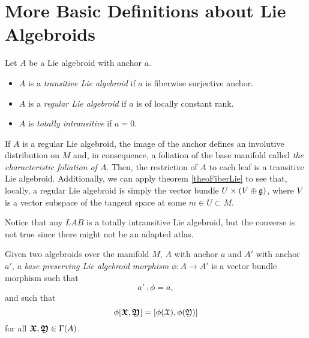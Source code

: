 \section{More Basic Definitions about Lie Algebroids}
\begin{definition}
    Let $A$ be a Lie algebroid with anchor $a$.
    
    \begin{itemize}
    
    \item $A$ is a \emph{transitive Lie algebroid} if $a$ is fiberwise surjective anchor.
    
    \item $A$ is a \emph{regular Lie algebroid} if $a$ is of locally constant rank.
    
    \item $A$ is \emph{totally intransitive} if $a = 0$.
    
    \end{itemize}
    
\end{definition}

If $A$ is a regular Lie algebroid, the image of the anchor defines an involutive distribution on $M$ and, in consequence, a foliation of the base manifold called \emph{the characteristic foliation of $A$}. Then, the restriction of $A$ to each leaf is a transitive Lie algebroid. Additionally, we can apply theorem \ref{theoFiberLie} to see that, locally, a regular Lie algebroid is simply the vector bundle $U \times (V \oplus \mathfrak{g})$, where $V$ is a vector subspace of the tangent space at some $m \in U \subset M$.

Notice that any $LAB$ is a totally intransitive Lie algebroid, but the converse is not true since there might not be an adapted atlas.

\begin{definition}  
Given two algebroids over the manifold $M$, $A$ with anchor $a$ and $A'$ with anchor $a'$, \emph{a base preserving Lie algebroid morphism} $\phi: A \to A'$ is a vector bundle morphism such that \[a' \comp \phi = a, \] and such that \[\phi[\sect{\oid X}, \sect{\oid Y}] = [\phi(\oid X), \phi(\oid Y)]\] for all $\bm{\mathfrak{X}}, \bm{\mathfrak{Y}} \in \Gamma(A)$. 
\end{definition}

